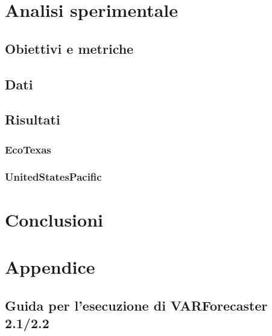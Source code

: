 \documentclass[12pt,a4paper,twoside,openright]{book}
\begin{document}
\chapter{Analisi sperimentale}
\newpage
\section{Obiettivi e metriche}
\newpage
\section{Dati}
\newpage
\section{Risultati}
\newpage
\subsection{EcoTexas}
\newpage
\subsection{UnitedStatesPacific}

\chapter{Conclusioni}
\chapter{Appendice}
\section{Guida per l’esecuzione di VARForecaster 2.1/2.2}\
\end{document}
